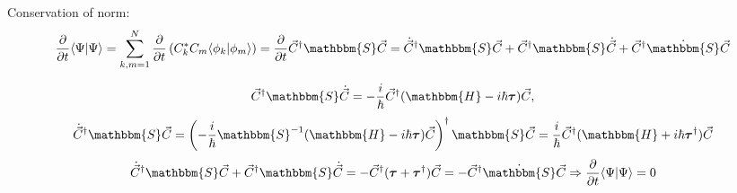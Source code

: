 \begin{frame}{}
\begin{block}{Conservation of norm:}
$$\frac{\partial}{\partial t}\myel{\Psi}{\Psi} = \sum_{k,m=1}^N\frac{\partial}{\partial t}\left( C_k^*C_m\myel{\phi_k}{\phi_m}\right) =%
  \frac{\partial}{\partial t}\vec{C}^{\dagger}\mathbbm{S}\vec{C} = \dot{\vec{C}}^{\dagger}\mathbbm{S}\vec{C} + %
								   \vec{C}^{\dagger}\mathbbm{S}\dot{\vec{C}} + %
								   \vec{C}^{\dagger}\dot{\mathbbm{S}}\vec{C}$$
\end{block}
$$\vec{C}^{\dagger}\mathbbm{S}\dot{\vec{C}} = -\frac{i}{\hbar}\vec{C}^{\dagger}(\mathbbm{H}-i\hbar\boldsymbol{\tau})\vec{C},$$
$$\dot{\vec{C}}^{\dagger}\mathbbm{S}\vec{C} = \left(-\frac{i}{\hbar}\mathbbm{S}^{-1}(\mathbbm{H}-i\hbar\boldsymbol{\tau})\vec{C}\right)^{\dagger}\mathbbm{S}\vec{C} = %
					    \frac{i}{\hbar}\vec{C}^{\dagger}(\mathbbm{H}+i\hbar\boldsymbol{\tau}^{\dagger})\vec{C}$$
$$\dot{\vec{C}}^{\dagger}\mathbbm{S}\vec{C} + \vec{C}^{\dagger}\mathbbm{S}\dot{\vec{C}} = %
					    - \vec{C}^{\dagger}(\boldsymbol{\tau}+\boldsymbol{\tau}^{\dagger})\vec{C} = -\vec{C}^{\dagger}\dot{\mathbbm{S}}\vec{C}\Rightarrow%
  \frac{\partial}{\partial t}\myel{\Psi}{\Psi} = 0$$
\end{frame}


